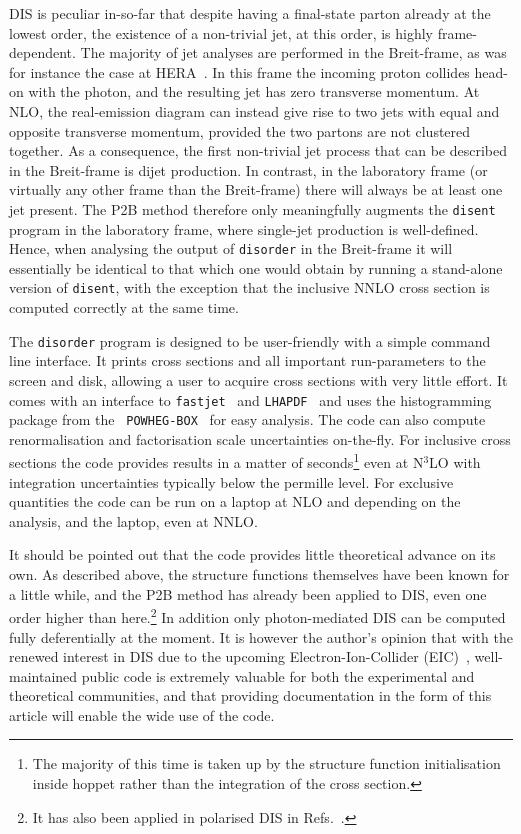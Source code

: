 \documentclass[submission, PhysCodeb]{SciPost_better_arXiv}
\newcommand{\hoppet}{{\sc hoppet}}
\newcommand{\disent}{{\tt disent}}
\newcommand{\disorder}{{\tt disorder}}
\newcommand{\fastjet}{{\tt fastjet}}
\newcommand{\lhapdf}{{\tt LHAPDF}}
\newcommand{\NNNLO}{N$^3$LO}
\begin{document}
DIS is peculiar in-so-far that despite having a final-state parton
already at the lowest order, the existence of a non-trivial jet, at
this order, is highly frame-dependent. The majority of jet analyses
are performed in the Breit-frame, as was for instance the case at
HERA~\cite{ZEUS:2006xvn,H1:2009pqp,ZEUS:2010vyw,H1:2014cbm,Baghdasaryan:2015yha,H1:2016goa}. In
this frame the incoming proton collides head-on with the photon, and
the resulting jet has zero transverse momentum. At NLO, the
real-emission diagram can instead give rise to two jets with equal and
opposite transverse momentum, provided the two partons are not
clustered together. As a consequence, the first non-trivial jet
process that can be described in the Breit-frame is dijet
production. In contrast, in the laboratory frame (or virtually any
other frame than the Breit-frame) there will always be at least one
jet present. The P2B method therefore only meaningfully augments the
\disent{} program in the laboratory frame, where single-jet production
is well-defined. Hence, when analysing the output of \disorder{} in
the Breit-frame it will essentially be identical to that which one
would obtain by running a stand-alone version of \disent{}, with the
exception that the inclusive NNLO cross section is computed correctly
at the same time.

The \disorder{} program is designed to be user-friendly with a simple
command line interface. It prints cross sections and all important
run-parameters to the screen and disk, allowing a user to acquire
cross sections with very little effort. It comes with an interface to
\fastjet{}~\cite{Cacciari:2011ma} and \lhapdf{}~\cite{Buckley:2014ana}
and uses the histogramming package from the {\tt
  POWHEG-BOX}~\cite{Alioli:2010xd} for easy analysis. The code can
also compute renormalisation and factorisation scale uncertainties
on-the-fly. For inclusive cross sections the code provides results in
a matter of seconds\footnote{The majority of this time is taken up by
the structure function initialisation inside \hoppet{} rather than the
integration of the cross section.} even at \NNNLO{} with integration
uncertainties typically below the permille level. For exclusive
quantities the code can be run on a laptop at NLO and depending on the
analysis, and the laptop, even at NNLO.

It should be pointed out that the code provides little theoretical
advance on its own. As described above, the structure functions
themselves have been known for a little while, and the P2B method has
already been applied to DIS, even one order higher than
here.\footnote{It has also been applied in polarised DIS in
Refs.~\cite{Borsa:2020ulb,Borsa:2020yxh,Borsa:2021afb,Borsa:2022irn,Borsa:2022cap}.}
In addition only photon-mediated DIS can be computed fully
deferentially at the moment. It is however the author's opinion that
with the renewed interest in DIS due to the upcoming
Electron-Ion-Collider (EIC)~\cite{AbdulKhalek:2022hcn},
well-maintained public code is extremely valuable for both the
experimental and theoretical communities, and that providing
documentation in the form of this article will enable the wide use of
the code.
\end{document}
